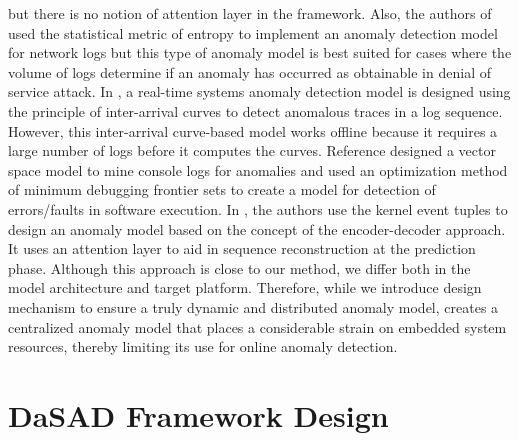 but there is no notion of attention layer in the framework. Also, the authors 
of \cite{gu2005detecting} used the statistical metric of entropy to implement 
an anomaly detection model for network logs but this type of anomaly model is 
best suited for cases where the volume of logs determine if an anomaly has 
occurred as obtainable in denial of service attack. In 
\cite{salem2016anomaly}, a real-time systems anomaly detection model is 
designed using the principle of inter-arrival curves to detect anomalous traces 
in a log sequence. However, this inter-arrival curve-based model works offline 
because it requires a large number of logs before it computes the curves. 
Reference \cite{xu2009largescale} designed a vector space model to mine console 
logs for anomalies and \cite{li2017locating} used an optimization method of 
minimum debugging frontier sets to create a model for detection of 
errors/faults in software execution. In \cite{Ezeme2018RTCSA}, the authors use 
the kernel event tuples to design an anomaly model based on the concept of the 
encoder-decoder approach. It uses an attention layer to aid in sequence 
reconstruction at the prediction phase. Although this approach is close to our 
method, we differ both in the model architecture and target platform. 
Therefore, while we introduce design mechanism to ensure a truly dynamic and 
distributed anomaly model, \cite{Ezeme2018RTCSA} creates a centralized anomaly 
model that places a considerable strain on embedded system resources, thereby 
limiting its use for online anomaly detection.

\section{D\MakeLowercase{a}SAD Framework Design}
\label{sec:design}
